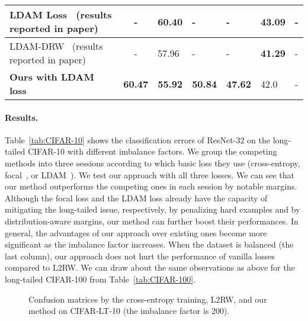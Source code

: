 \begin{table*}
{\begin{tabular}{l|c|l|l|l|l|l}
LDAM Loss~\cite{LDAM} (results reported in paper) &  - &  60.40  & -  & -  &  43.09 & - \\ \hline


LDAM-DRW~\cite{LDAM} (results reported in paper)& - & 57.96  & - & - & \textbf{41.29}  & - \\ \hline


{\bf Ours with LDAM loss} & {\bf 60.47} & \textbf{55.92} & \textbf{50.84} & \textbf{47.62} & 42.0 & - \\ \hline


\end{tabular}
}\vspace{-10pt}
\end{table*}

\vspace{-10pt}
\paragraph{Results.}
Table~\ref{tab:CIFAR-10} shows the classification errors of ResNet-32 on the long-tailed CIFAR-10 with different imbalance factors. We group the competing methods into three sessions according to which basic loss they use (cross-entropy, focal~\cite{Focalloss}, or LDAM~\cite{LDAM}). We test our approach with all three losses. We can see that our method outperforms the competing ones in each session by notable margins. Although the focal loss and the LDAM loss already have the capacity of mitigating the long-tailed issue, respectively, by penalizing hard examples and by distribution-aware margins, our method can further boost their performances. In general, the advantages of our approach over existing ones become more significant as the imbalance factor increases. When the dataset is balanced (the last column), our approach does not hurt the performance of vanilla losses compared to L2RW. We can draw about the same observations as above for the long-tailed CIFAR-100 from Table~\ref{tab:CIFAR-100}.




\begin{figure*}
    \centering
    \centering
    \centering
    \caption{Confusion matrices by the cross-entropy training, L2RW, and our method on CIFAR-LT-10 (the imbalance factor is 200).}
    \label{fig:confusion_matrices}
    \vspace{-5pt}
\end{figure*}


